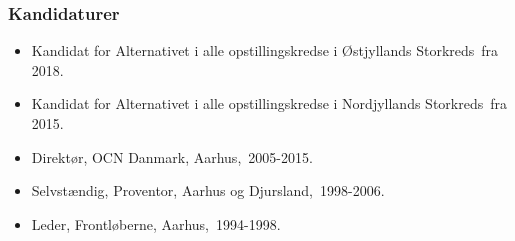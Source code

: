 \documentclass[11pt, a4paper]{awesome-cv}
\begin{document}
\begin{cvletter}
\subsubsection*{Kandidaturer}
\begin{itemize}
\item Kandidat for Alternativet i alle opstillingskredse i Østjyllands Storkreds fra 2018.
\item Kandidat for Alternativet i alle opstillingskredse i Nordjyllands Storkreds fra 2015.
\end{itemize}
\begin{itemize}
\item Direktør, OCN Danmark, Aarhus, 2005-2015.
\item Selvstændig, Proventor, Aarhus og Djursland, 1998-2006.
\item Leder, Frontløberne, Aarhus, 1994-1998.
\end{itemize}
\end{cvletter}
\end{document}
